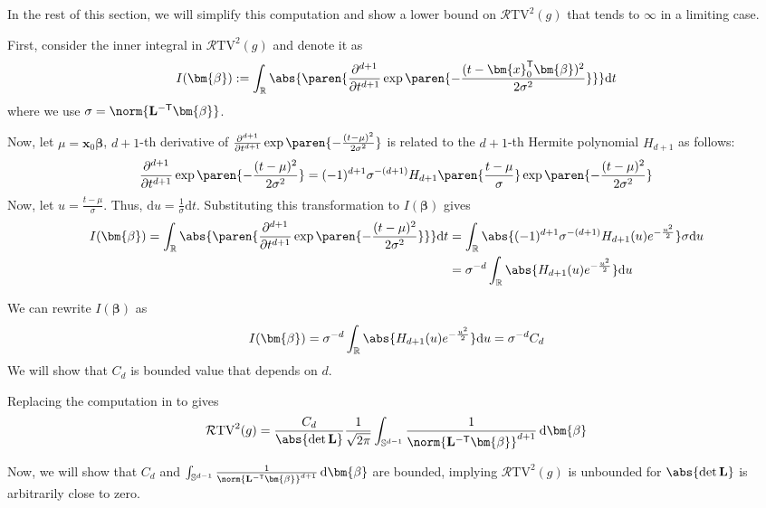 In the rest of this section, we will simplify this computation and show a lower bound on $\mathcal{R}\mathrm{TV}^2(g)$ that tends to $\infty$ in a limiting case.

First, consider the inner integral in $\mathcal{R}\mathrm{TV}^2(g)$ and denote it as
\[
I(\bm{\beta}) := \int_\mathbb{R}
    \abs{ \paren{\frac{\partial^{d+1}}{\partial t^{d+1}} \exp\paren{-\frac{(t-\bm{x}_0^\mathsf{T}\bm{\beta})^2}{2\sigma^2}}}} \mathrm{d}t
\]
where we use $\sigma = \norm{\mathbf{L}^{-\mathsf{T}}\bm{\beta}}$.

Now, let $\mu = \bm{x}_0\bm{\beta}$, $d+1$-th derivative of $\frac{\partial^{d+1}}{\partial t^{d+1}} \exp\paren{-\frac{(t-\mu)^2}{2\sigma^2}}$ is related to the $d+1$-th Hermite polynomial $H_{d+1}$ as follows:
\[
\frac{\partial^{d+1}}{\partial t^{d+1}} \exp\paren{-\frac{(t-\mu)^2}{2\sigma^2}} = (-1)^{d+1} \sigma^{-(d+1)} H_{d+1}\paren{\frac{t-\mu}{\sigma}} \exp\paren{-\frac{(t-\mu)^2}{2\sigma^2}}
\]
Now, let $u = \frac{t - \mu}{\sigma}$. Thus, $\mathrm{d}u = \frac{1}{\sigma} \mathrm{d}t$. Substituting this transformation to $I(\bm{\beta})$ gives
\begin{align}
I(\bm{\beta}) = \int_\mathbb{R}
    \abs{ \paren{\frac{\partial^{d+1}}{\partial t^{d+1}} \exp\paren{-\frac{(t-\mu)^2}{2\sigma^2}}}} \mathrm{d}t &= \int_\mathbb{R} \abs{ (-1)^{d+1} \sigma^{-(d+1)} H_{d+1}(u) e^{-\frac{u^2}{2}}} \sigma \mathrm{d}u \label{eq: singleint1}\\
    &= \sigma^{-d} \int_\mathbb{R} \abs{H_{d+1}(u) e^{-\frac{u^2}{2}}} \mathrm{d}u \label{eq: singleint2}
\end{align}

We can rewrite $I(\bm{\beta})$ as
\[
I(\bm{\beta}) = \sigma^{-d} \int_\mathbb{R} \abs{H_{d+1}(u) e^{-\frac{u^2}{2}}} \mathrm{d}u = \sigma^{-d} C_d
\]
We will show that $C_d$ is bounded value that depends on $d$.

Replacing the computation in  to  gives
\begin{align}
    \mathcal{R}\mathrm{TV}^2(g) = \frac{C_d}{\abs{\det \mathbf{L}}} \frac{1}{\sqrt{2\pi}} \int_{\mathbb{S}^{d-1}} \frac{1}{{\norm{\mathbf{L}^{-\mathsf{T}}\bm{\beta}}^{d+1}}} \,\mathrm{d}\bm{\beta} \label{eq: simprtv}
\end{align}

Now, we will show that $C_d$ and $\int_{\mathbb{S}^{d-1}} \frac{1}{{\norm{\mathbf{L}^{-\mathsf{T}}\bm{\beta}}^{d+1}}} \,\mathrm{d}\bm{\beta}$ are bounded, implying $\mathcal{R}\mathrm{TV}^2(g)$ is unbounded for $\abs{\det \mathbf{L}}$ is arbitrarily close to zero.

